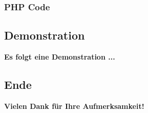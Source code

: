 \begin{frame}
  \frametitle{PHP Code}
  \makeset
\end{frame}



\subsection{Demonstration}
\begin{frame} %

  \textbf{Es folgt eine Demonstration ...}
\end{frame}

\subsection{Ende}
\begin{frame}
\center
 \textbf{Vielen Dank für Ihre Aufmerksamkeit!}
\end{frame}
